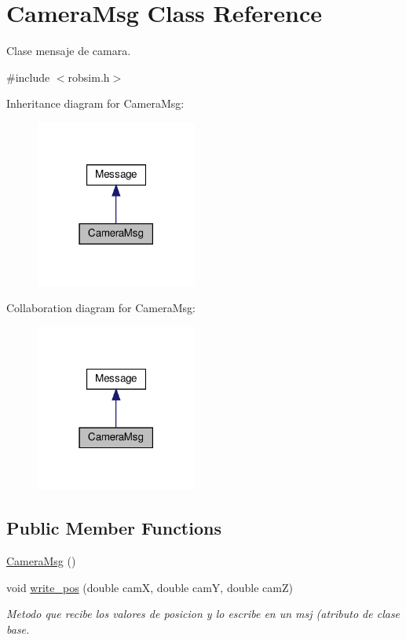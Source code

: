 \hypertarget{classCameraMsg}{}\section{Camera\+Msg Class Reference}
\label{classCameraMsg}


Clase mensaje de camara.  




{\ttfamily \#include $<$robsim.\+h$>$}



Inheritance diagram for Camera\+Msg\+:\nopagebreak
\begin{figure}[H]
\begin{center}
\leavevmode
\includegraphics[width=150pt]{classCameraMsg__inherit__graph}
\end{center}
\end{figure}


Collaboration diagram for Camera\+Msg\+:\nopagebreak
\begin{figure}[H]
\begin{center}
\leavevmode
\includegraphics[width=150pt]{classCameraMsg__coll__graph}
\end{center}
\end{figure}
\subsection*{Public Member Functions}
\begin{DoxyCompactItemize}
\item 
\hyperlink{classCameraMsg_a5c60f7195b2abc7fdbd2c4568c8708d4}{Camera\+Msg} ()
\item 
void \hyperlink{classCameraMsg_a533eef67ac13dabdb81969eff6aaa267}{write\+\_\+pos} (double camX, double camY, double camZ)
\begin{DoxyCompactList}\small\item\em Metodo que recibe los valores de posicion y lo escribe en un msj (atributo de clase base. \end{DoxyCompactList}\end{DoxyCompactItemize}
